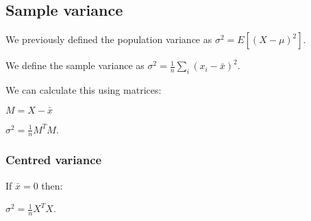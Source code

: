 
\subsection{Sample variance}

We previously defined the population variance as \(\sigma^2=E[(X-\mu)^2]\).

We define the sample variance as \(\sigma^2=\frac{1}{n}\sum_i(x_i-\bar x)^2\).

We can calculate this using matrices:

\(M=X-\bar x\)

\(\sigma^2=\frac{1}{n}M^TM\).

\subsubsection{Centred variance}

If \(\bar x =0\) then:

\(\sigma^2=\frac{1}{n}X^TX\).

